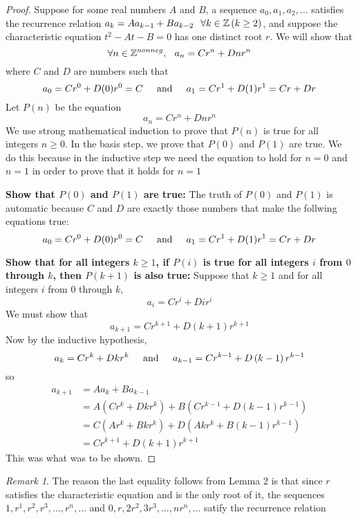 \documentclass{article}
\theoremstyle{definition}
\theoremstyle{remark}
\newtheorem*{remark}{Remark}
\theoremstyle{plain}
\begin{document}
\begin{proof}
  Suppose for some real numbers $A$ and $B$, a sequence $a_0, a_1, a_2, \ldots$ satisfies the recurrence relation $a_k = Aa_{k-1} + Ba_{k-2} \hspace{0.1in} \forall k \in \mathbb{Z}\left(k\geq 2\right)$, and suppose the characteristic equation $t^2-At-B=0$ has one distinct root $r$. We will show that 
  \[
    \forall n \in \mathbb{Z}^{nonneg}, \hspace{0.1in} a_n = Cr^n + Dnr^n
  \]
  where $C$ and $D$ are numbers such that \\
  \[
    a_0 = Cr^{0} + D(0)r^{0} = C \hspace{0.2in} \text{and} \hspace{0.2in} a_1 = Cr^{1} + D(1)r^{1} = Cr + Dr
  \]
  Let $P(n)$ be the equation 
  \[
    a_n = Cr^{n} + Dnr^{n} 
  \]
  We use strong mathematical induction to prove that $P(n)$ is true for all integers $n \geq 0$. In the basis step, we prove that $P(0)$ and $P(1)$ are true. We do this because in the inductive step we need the equation to hold for $n=0$ and $n=1$ in order to prove that it holds for $n=1$

  \textbf{Show that $P(0)$ and $P(1)$ are true:} The truth of $P(0)$ and $P(1)$ is automatic because $C$ and $D$ are exactly those numbers that make the follwing equations true:
  \[
    a_0 = Cr^{0} + D(0)r^{0} = C \hspace{0.2in} \text{and} \hspace{0.2in} a_1 = Cr^{1} + D(1)r^{1} = Cr + Dr
  \]

  \textbf{Show that for all integers $k\geq 1$, if $P(i)$ is true for all integers $i$ from $0$ through $k$, then $P(k+1)$ is also true:} Suppose that $k\geq 1$ and for all integers $i$ from $0$ through $k$, 
  \[ a_i = Cr^{i} + Dir^{i}\] 
  We must show that 
  \[ a_{k+1} = Cr^{k+1} + D\left(k+1\right)r^{k+1}\]
  Now by the inductive hypothesis, 
  \[ a_k = Cr^{k} + Dkr^{k} \hspace{0.2in} \text{and} \hspace{0.2in} a_{k-1} = Cr^{k-1} + D\left(k-1\right)r^{k-1} \]
  so 
  \begin{align*}
    a_{k+1} &= Aa_{k} + Ba_{k-1} \tag{by definition of $a_0, a_1, a_2, \ldots$} \\ 
    &= A\left(Cr^{k} + Dkr^{k}\right) + B\left(Cr^{k-1} + D\left(k-1\right)r^{k-1}\right) \tag{by inductive hypothesis}\\ 
    &= C\left(Ar^{k} + Bkr^{k}\right) + D\left(Akr^{k} + B\left(k-1\right)r^{k-1}\right) \tag{by combining like terms} \\ 
    &= Cr^{k+1} + D\left(k+1\right)r^{k+1} \tag{by Lemma 2}
  \end{align*}
  This was what was to be shown. 

\end{proof}
\begin{remark}
  The reason the last equality follows from Lemma 2 is that since $r$ satisfies the characteristic equation and is the only root of it, the sequences $1, r^{1}, r^{2}, r^{3}, \ldots, r^{n}, \ldots$ and $0, r, 2r^{2}, 3r^{3}, \ldots, nr^{n}, \ldots$ satify the recurrence relation
\end{remark}
\end{document}
